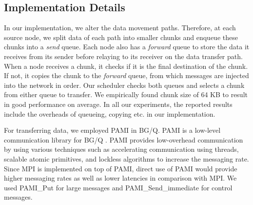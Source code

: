 \subsection{Implementation Details}

In our implementation, we alter the data movement paths. Therefore, at each source node, we split data of each path into smaller chunks and enqueue these chunks into a {\em send} queue. Each node also has a {\em forward} queue to store the data it receives from its sender before relaying to its receiver on the data transfer path. When a node receives a chunk, it checks if it is the final destination of the chunk. If not, it copies the chunk to the {\em forward} queue, from which messages are injected into the network in order. Our scheduler checks both queues and selects a chunk from either queue to transfer. %
We empirically found chunk size of 64 KB to result in good performance on average. 
In all our experiments, the reported results include the overheads of queueing, copying etc. in our implementation. 

For transferring data, we employed PAMI in BG/Q. PAMI is a low-level communication library for BG/Q \cite{PAMI:Kumar}. PAMI provides low-overhead communication by using various techniques such as accelerating communication using threads, scalable atomic primitives, and lockless algorithms to increase the messaging rate. Since MPI is implemented on top of PAMI, direct use of PAMI would provide higher messaging rates as well as lower latencies in comparison with MPI. We used PAMI\_Put for large messages and PAMI\_Send\_immediate for control messages.

